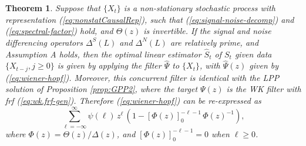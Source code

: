 \documentclass[a4paper]{book}
\newtheorem{Theorem}{Theorem}
\begin{document}
 

 
 
 
\begin{Theorem}
\label{thm:asym.sigex}
 Suppose that $\{ X_t \}$ is  a non-stationary stochastic process
 with representation (\ref{eq:nonstatCausalRep}), such that
 (\ref{eq:signal-noise-decomp}) and (\ref{eq:spectral-factor}) hold,
  and $\Theta (z)$ is invertible.
 If the signal and noise differencing operators
 $\Delta^S (L)$ and $\Delta^N (L)$ are relatively prime, and Assumption A holds,
 then  the  optimal linear estimator $\widehat{S}_t$   of $S_t$ given data 
  $\{ X_{t-j}, j \geq 0 \}$ is   given by
 applying the filter $\widehat{\Psi} $  to $\{  X_t \}$, 
 with $\widehat{\Psi} (z)$  given by (\ref{eq:wiener-hopf}). 
 Moreover, this concurrent filter is identical with
 the LPP solution of Proposition \ref{prop:GPP2}, where the target 
 $\Psi (z)$ is the WK filter with frf (\ref{eq:wk.frf-gen}).
 Therefore (\ref{eq:wiener-hopf}) can be re-expressed as
\begin{equation}
\label{eq:optimal-conc-comp}
 \sum_{\ell = -\infty}^{\infty}  \psi  (\ell)  \,  z^{\ell}
 \, \left( 1 -  { [  \Phi (z) ]}_0^{-\ell-1} \, { \Phi (z) }^{-1} \right),
\end{equation}
 where   $\Phi(z) = \Theta (z) / \Delta (z)$, and ${ [  \Phi (z) ]}_0^{-\ell-1} = 0$
 when $\ell \geq 0$.
\end{Theorem}
 
\end{document}
